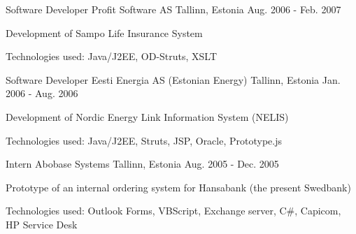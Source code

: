 \begin{cventries}
{  }
  \cventry
  {Software Developer}
  {Profit Software AS}
  {Tallinn, Estonia}
  {Aug. 2006 - Feb. 2007}
  {
    \begin{cvitems}
      \item { Development of Sampo Life Insurance System}
      \item { Technologies used: Java/J2EE, OD-Struts, XSLT }
    \end{cvitems}
  }
  \cventry
  {Software Developer}
  {Eesti Energia AS (Estonian Energy)}
  {Tallinn, Estonia}
  {Jan. 2006 - Aug. 2006}
  {
    \begin{cvitems}
      \item { Development of Nordic Energy Link Information System (NELIS)}
      \item { Technologies used: Java/J2EE, Struts, JSP, Oracle, Prototype.js }
    \end{cvitems}
  }
  \cventry
  {Intern}
  {Abobase Systems}
  {Tallinn, Estonia}
  {Aug. 2005 - Dec. 2005}
  {
    \begin{cvitems}
      \item { Prototype of an internal ordering system for Hansabank (the present Swedbank)}
      \item { Technologies used: Outlook Forms, VBScript, Exchange server, C#, Capicom, HP Service Desk }
    \end{cvitems}
  }
\end{cventries}
